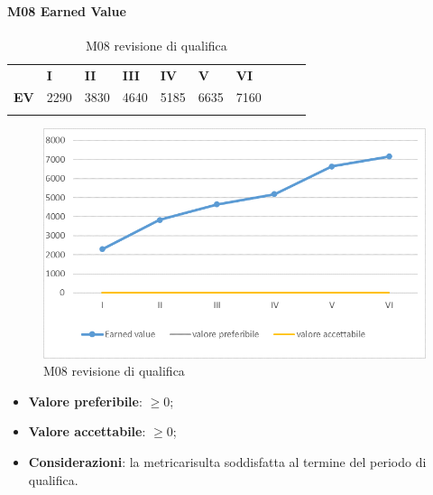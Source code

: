 \paragraph{M08 Earned Value} \mbox{}
\begin{longtable}[H!] {						
		>{}p{50mm}  		
		>{}p{8mm}
		>{}p{8mm}		
		>{}p{8mm}		
		>{}p{8mm}		
		>{}p{8mm}		
		>{}p{8mm}
		>{}p{8mm}
		>{}p{8mm}
		>{}p{8mm}
	}
	\rowcolor{gray!50}
	\textbf{} & \textbf{I} & \textbf{II} & \textbf{III} & \textbf{IV} & \textbf{V} & \textbf{VI} \TBstrut \\ [2mm]
	\textbf{EV} & 2290 & 3830 & 4640 & 5185 & 6635 & 7160 \TBstrut \\ [2mm]
	\rowcolor{white}
	\caption{M08 revisione di qualifica}
\end{longtable}
\begin{figure}[H] 	
	\includegraphics[width=\linewidth]{./img/grafici/RQ8.png}	
	\caption{M08 revisione di qualifica}	
\end{figure}
\begin{itemize}
	\item \textbf{Valore preferibile}: $\ge0$;
	\item \textbf{Valore accettabile}: $\ge0$;
	\item \textbf{Considerazioni}: la metrica\glosp risulta soddisfatta al termine del periodo di qualifica.
\end{itemize}

